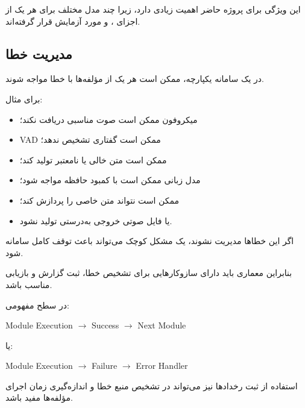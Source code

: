 این ویژگی برای پروژه حاضر اهمیت زیادی دارد، زیرا چند مدل
مختلف برای هر یک از اجزای ،  و  مورد آزمایش
قرار گرفته‌اند.


\subsection{مدیریت خطا}

در یک سامانه یکپارچه، ممکن است هر یک از مؤلفه‌ها با خطا مواجه
شوند.

برای مثال:

\begin{itemize}

    \item میکروفون ممکن است صوت مناسبی دریافت نکند؛

    \item VAD ممکن است گفتاری تشخیص ندهد؛

    \item {} ممکن است متن خالی یا نامعتبر تولید کند؛

    \item مدل زبانی ممکن است با کمبود حافظه مواجه شود؛

    \item {} ممکن است نتواند متن خاصی را پردازش کند؛

    \item یا فایل صوتی خروجی به‌درستی تولید نشود.

\end{itemize}

اگر این خطاها مدیریت نشوند، یک مشکل کوچک می‌تواند باعث توقف
کامل سامانه شود.

بنابراین معماری باید دارای سازوکارهایی برای تشخیص خطا،
ثبت گزارش و بازیابی مناسب باشد.

در سطح مفهومی:

\begin{center}
Module Execution
$\longrightarrow$
Success
$\longrightarrow$
Next Module
\end{center}

یا:

\begin{center}
Module Execution
$\longrightarrow$
Failure
$\longrightarrow$
Error Handler
\end{center}

استفاده از ثبت رخدادها
نیز می‌تواند در تشخیص منبع خطا و اندازه‌گیری زمان اجرای
مؤلفه‌ها مفید باشد.


